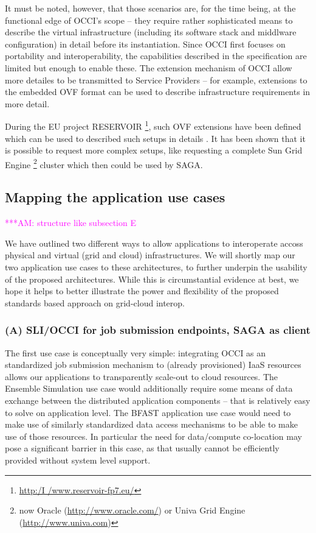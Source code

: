 \documentclass[10pt,conference,final,letterpaper,twoside,twocolumn,]{IEEEtran}
\newcommand{\amnote}[1]{  {\textcolor{magenta} {***AM: #1}}}
\newcommand{\amnote}[1]{}
\begin{document}
 It must be noted, however, that those scenarios are, for the time
 being, at the functional edge of OCCI's scope -- they require rather
 sophisticated means to describe the virtual infrastructure (including
 its software stack and middlware configuration) in detail before
 its instantiation. Since OCCI first focuses on portability and
 interoperability, the capabilities described in the specification are
 limited but enough to enable these. The extension mechanism of OCCI
 allow more detailes to be transmitted to Service Providers -- for
 example, extensions to the embedded OVF format can be used to
 describe infrastructure requirements in more detail.

 During the EU project RESERVOIR
 \footnote{\url{http:/I /www.reservoir-fp7.eu/}}, such OVF extensions
 have been defined which can be used to described such setups in
 details \cite{comsware09}.  It has been shown that it is possible to
 request more complex setups, like requesting a complete Sun Grid
 Engine \footnote{now Oracle (\url{http://www.oracle.com/}) or Univa
 Grid Engine (\url{http://www.univa.com})} cluster which then could be
 used by SAGA.


 \subsection{Mapping the application use cases}

 \amnote{structure like subsection E}

 We have outlined two different ways to allow applications to
 interoperate accoss physical and virtual (grid and cloud)
 infrastructures.  We will shortly map our two application use cases
 to these architectures, to further underpin the usability of the
 proposed architectures.  While this is circumstantial evidence at
 best, we hope it helps to better illustrate the power and flexibility
 of the proposed standards based approach on grid-cloud interop.

 \subsubsection*{(A) SLI/OCCI for job submission endpoints, SAGA as client}

 The first use case is conceptually very simple: integrating OCCI as
 an standardized job submission mechanism to (already provisioned)
 IaaS resources allows our applications to transparently scale-out to
 cloud resources.  The Ensemble Simulation use case would additionally
 require some means of data exchange between the distributed
 application components -- that is relatively easy to solve on
 application level.  The BFAST application use case would need to make
 use of similarly standardized data access mechanisms to be able to
 make use of those resources.  In particular the need for data/compute
 co-location may pose a significant barrier in this case, as that
 usually cannot be efficiently provided without system level support.
  
\end{document}
